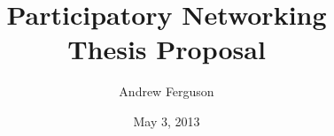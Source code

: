 \documentclass[10pt]{book}
\begin{document}
\VerbatimFootnotes

\author{Andrew Ferguson}
\title{Participatory Networking \\ Thesis Proposal}
\date{May 3, 2013}



%


\frontmatter %

\maketitle %
\tableofcontents %

\mainmatter %

\doublespacing





%








\backmatter %



\end{document}
